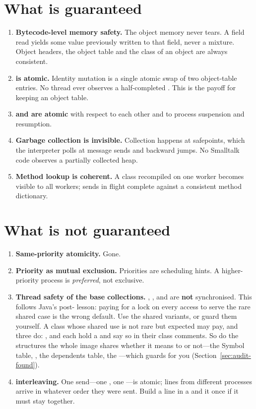 \section{What is guaranteed}

\begin{enumerate}
\item \textbf{Bytecode-level memory safety.} The object memory never tears. A
  field read yields some value previously written to that field, never a
  mixture. Object headers, the object table and the class of an object are
  always consistent.
\item \textbf{ is atomic.} Identity mutation is a single atomic
  swap of two object-table entries. No thread ever observes a half-completed
  . This is the payoff for keeping an object table.
\item \textbf{ and  are atomic} with respect to
  each other and to process suspension and resumption.
\item \textbf{Garbage collection is invisible.} Collection happens at
  safepoints, which the interpreter polls at message sends and backward jumps.
  No Smalltalk code observes a partially collected heap.
\item \textbf{Method lookup is coherent.} A class recompiled on one worker
  becomes visible to all workers; sends in flight complete against a
  consistent method dictionary.
\end{enumerate}

\section{What is not guaranteed}

\begin{enumerate}
\item \textbf{Same-priority atomicity.} Gone.
\item \textbf{Priority as mutual exclusion.} Priorities are scheduling hints.
  A higher-priority process is \emph{preferred}, not exclusive.
\item \textbf{Thread safety of the base collections.}
  , ,  and  are
  \textbf{not} synchronised. This follows Java's post- lesson:
  paying for a lock on every access to serve the rare shared case is the wrong
  default. Use the shared variants, or guard them yourself. A class whose
  shared use is not rare but expected may pay, and three do:
  ,  and  each hold a
   and say so in their class comments. So do the structures the
  whole image shares whether it means to or not---the Symbol table,
  , the dependents table, the ---which
   guards for you (Section~\ref{sec:audit-found}).
\item \textbf{ interleaving.} One send---one , one
  ---is atomic; lines from different processes arrive in whatever
  order they were sent. Build a line in a  and  it
  once if it must stay together.
\end{enumerate}

